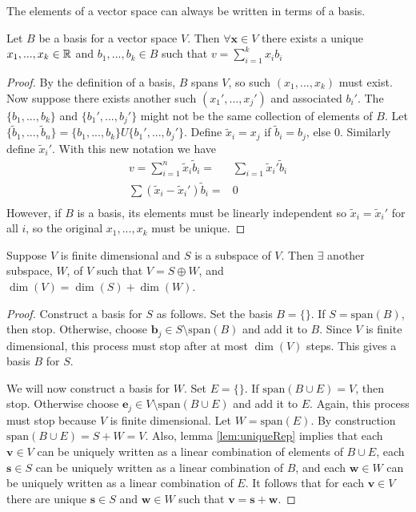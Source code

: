 The elements of a vector space can always be written in terms of a
basis. 
\begin{lemma} \label{lem:uniqueRep}
  Let $B$ be a basis for a vector space $V$. Then
  $\forall \mathbf{x} \in V$ there exists a unique $x_1, ..., x_k \in \mathbb{R}$ and
  $b_1, ..., b_k \in B$
  such that $ v = \sum_{i=1}^k x_i b_i$  
\end{lemma}
\begin{proof}
  By the definition of a basis, $B$ spans $V$, so such
  $(x_1, ..., x_k)$ must exist. Now suppose there exists another such
  $(x_1', ..., x_j')$ and associated $b_i'$. The $\{b_1, ..., b_k\}$ and
  $\{b_1', ..., b_j'\}$ might not be the same collection of elements
  of $B$. Let $\{\tilde{b}_1, ..., \tilde{b}_n \} =  \{b_1, ...,
  b_k\} U \{b_1', ..., b_j'\}$. Define $\tilde{x}_i = x_j$ if
  $\tilde{b}_i = b_j$, else $0$. Similarly define $\tilde{x}_i'$. With
  this new notation we have
  \begin{align*}
    v = \sum_{i=1}^n \tilde{x}_i \tilde{b}_i = & \sum_{i=1} \tilde{x}_i' \tilde{b}_i \\
    \sum (\tilde{x}_i - \tilde{x}_i')\tilde{b}_i = & 0 \\
  \end{align*}
  However, if $B$ is a basis, its elements must be linearly
  independent so $\tilde{x}_i = \tilde{x}_i'$ for all $i$, so the
  original $x_1, ..., x_k$ must be unique.
\end{proof}

\begin{lemma}\label{lem:directSum}
  Suppose $V$ is finite dimensional and $S$ is a subspace of $V$. Then
  $\exists$ another subspace, $W$, of $V$ such that $V = S \oplus W$,
  and $\dim(V) = \dim(S) + \dim(W)$.
\end{lemma}
\begin{proof}
  Construct a basis for $S$ as follows. Set the basis $B = \{\}$. If
  $S = \text{span}(B)$, then stop. Otherwise, choose $\mathbf{b}_j \in
  S \setminus \text{span}(B)$ and add it to $B$. Since $V$ is finite
  dimensional, this process must stop after at most $\dim(V)$
  steps. This gives a basis $B$ for $S$. 

  We will now construct a basis for $W$. Set $E = \{\}$. If
  $\text{span}(B \cup E) = V$, then stop. Otherwise choose $\mathbf{e}_j \in V
  \setminus \text{span}(B \cup E)$ and add it to $E$. Again, this
  process must stop because $V$ is finite dimensional. Let $W =
  \text{span}(E)$. By construction $\text{span}(B \cup E) = S + W =
  V$. Also, lemma \ref{lem:uniqueRep} implies that each $\mathbf{v}
  \in V$ can be uniquely written as a linear combination of elements
  of $B \cup E$, each $\mathbf{s} \in S$ can be uniquely written as a
  linear combination of $B$, and each $\mathbf{w} \in W$ can be
  uniquely written as a linear combination of $E$. It follows that for
  each $\mathbf{v} \in V$ there are unique $\mathbf{s} \in S$ and
  $\mathbf{w} \in W$ such that $\mathbf{v} = \mathbf{s} +
  \mathbf{w}$. 
\end{proof}


